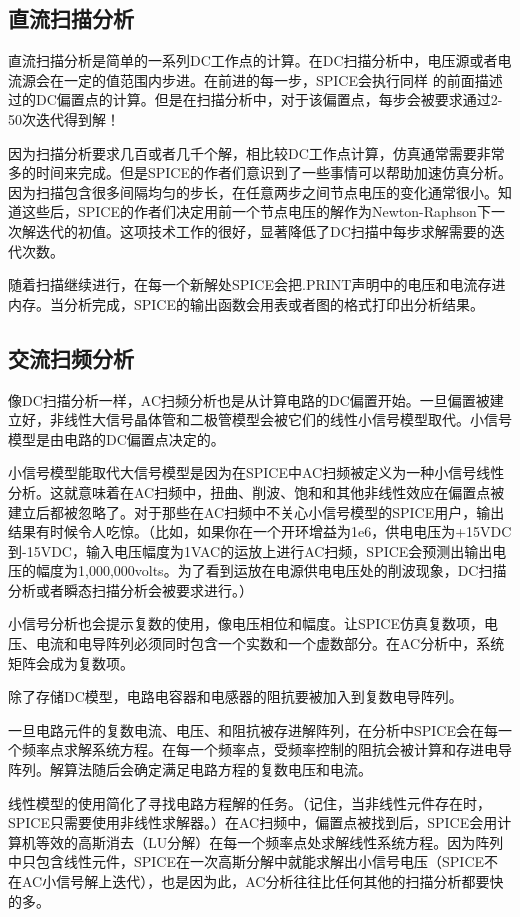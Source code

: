 \subsection{直流扫描分析}
直流扫描分析是简单的一系列DC工作点的计算。在DC扫描分析中，电压源或者电流源会在一定的值范围内步进。在前进的每一步，SPICE会执行同样 的前面描述过的DC偏置点的计算。但是在扫描分析中，对于该偏置点，每步会被要求通过2-50次迭代得到解！

因为扫描分析要求几百或者几千个解，相比较DC工作点计算，仿真通常需要非常多的时间来完成。但是SPICE的作者们意识到了一些事情可以帮助加速仿真分析。因为扫描包含很多间隔均匀的步长，在任意两步之间节点电压的变化通常很小。知道这些后，SPICE的作者们决定用前一个节点电压的解作为Newton-Raphson下一次解迭代的初值。这项技术工作的很好，显著降低了DC扫描中每步求解需要的迭代次数。

随着扫描继续进行，在每一个新解处SPICE会把.PRINT声明中的电压和电流存进内存。当分析完成，SPICE的输出函数会用表或者图的格式打印出分析结果。

\subsection{交流扫频分析}
像DC扫描分析一样，AC扫频分析也是从计算电路的DC偏置开始。一旦偏置被建立好，非线性大信号晶体管和二极管模型会被它们的线性小信号模型取代。小信号模型是由电路的DC偏置点决定的。

小信号模型能取代大信号模型是因为在SPICE中AC扫频被定义为一种小信号线性分析。这就意味着在AC扫频中，扭曲、削波、饱和和其他非线性效应在偏置点被建立后都被忽略了。对于那些在AC扫频中不关心小信号模型的SPICE用户，输出结果有时候令人吃惊。（比如，如果你在一个开环增益为1e6，供电电压为+15VDC到-15VDC，输入电压幅度为1VAC的运放上进行AC扫频，SPICE会预测出输出电压的幅度为1,000,000volts。为了看到运放在电源供电电压处的削波现象，DC扫描分析或者瞬态扫描分析会被要求进行。）

小信号分析也会提示复数的使用，像电压相位和幅度。让SPICE仿真复数项，电压、电流和电导阵列必须同时包含一个实数和一个虚数部分。在AC分析中，系统矩阵会成为复数项。

除了存储DC模型，电路电容器和电感器的阻抗要被加入到复数电导阵列。

一旦电路元件的复数电流、电压、和阻抗被存进解阵列，在分析中SPICE会在每一个频率点求解系统方程。在每一个频率点，受频率控制的阻抗会被计算和存进电导阵列。解算法随后会确定满足电路方程的复数电压和电流。

线性模型的使用简化了寻找电路方程解的任务。（记住，当非线性元件存在时，SPICE只需要使用非线性求解器。）在AC扫频中，偏置点被找到后，SPICE会用计算机等效的高斯消去（LU分解）在每一个频率点处求解线性系统方程。因为阵列中只包含线性元件，SPICE在一次高斯分解中就能求解出小信号电压（SPICE不在AC小信号解上迭代），也是因为此，AC分析往往比任何其他的扫描分析都要快的多。


